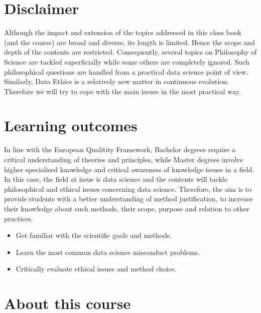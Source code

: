 \documentclass[
]{book}
\providecommand{\tightlist}{%
  \setlength{\itemsep}{0pt}\setlength{\parskip}{0pt}}
\begin{document}
\hypertarget{disclaimer}{%
\section*{Disclaimer}\label{disclaimer}}

Although the impact and extension of the topics addressed in this class book (and the course) are broad and diverse, its length is limited. Hence the scope and depth of the contents are restricted. Consequently, several topics on Philosophy of Science are tackled superficially while some others are completely ignored. Such philosophical questions are handled from a practical data science point of view. Similarly, Data Ethics is a relatively new matter in continuous evolution. Therefore we will try to cope with the main issues in the most practical way.

\hypertarget{learning-outcomes}{%
\section*{Learning outcomes}\label{learning-outcomes}}

In line with the European Qualitity Framework, Bachelor degrees require a critical understanding of theories and principles, while Master degrees involve higher specialised knowledge and critical awareness of knowledge issues in a field. In this case, the field at issue is data science and the contents will tackle philosophical and ethical issues concerning data science. Therefore, the aim is to provide students with a better understanding of method justification, to increase their knowledge about such methods, their scope, purpose and relation to other practices.

\begin{itemize}
\tightlist
\item
  Get familiar with the scientific goals and methods.
\item
  Learn the most common data science misconduct problems.
\item
  Critically evaluate ethical issues and method choice.
\end{itemize}

\hypertarget{about-this-course}{%
\section*{About this course}\label{about-this-course}}
\end{document}

